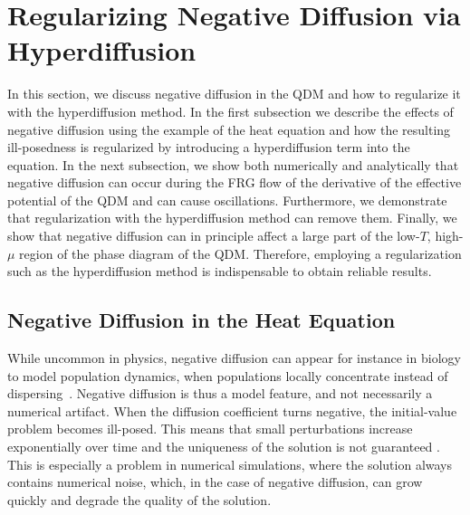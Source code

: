 \documentclass[
onecolumn,
aps,
prd,
amsmath,
amssymb,
nofootinbib
]{revtex4-2}
\begin{document}
\section{Regularizing Negative Diffusion via Hyperdiffusion}\label{sec:3}
In this section, we discuss negative diffusion in the QDM and how to regularize it with the hyperdiffusion method. 
In the first subsection we describe the effects of negative diffusion using the example of the heat equation and how the resulting ill-posedness is regularized by introducing a hyperdiffusion term into the equation. 
In the next subsection, we show both numerically and analytically that negative diffusion can occur during the FRG flow of the derivative of the effective potential of the QDM and can cause oscillations. 
Furthermore, we demonstrate that regularization with the hyperdiffusion method can remove them. 
Finally, we show that negative diffusion can in principle affect a large part of the low-$T$, high-$\mu$ region of the phase diagram of the QDM.
Therefore, employing a regularization such as the hyperdiffusion method is indispensable to obtain reliable results. 


\subsection{Negative Diffusion in the Heat Equation}
While uncommon in physics, negative diffusion can appear for instance in biology to model population dynamics, when populations locally concentrate instead of dispersing~\cite{grindrod1988models,grunbaum1994modelling}. 
Negative diffusion is thus a model feature, and not necessarily a numerical artifact.
When the diffusion coefficient turns negative, the initial-value problem becomes ill-posed. 
This means that small perturbations increase exponentially over time and the uniqueness of the solution is not guaranteed \cite{Tikhonov1995}. 
This is especially a problem in numerical simulations, where the solution always contains numerical noise, which, in the case of negative diffusion, can grow quickly and degrade the quality of the solution.
\end{document}
